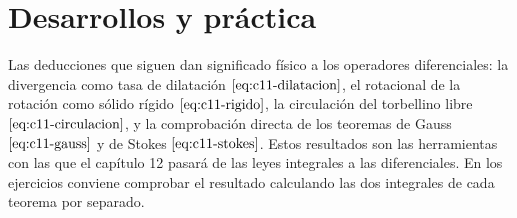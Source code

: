 \documentclass[10pt,openany]{book}
\begin{document}
\section{Desarrollos y práctica}

Las deducciones que siguen dan significado físico a los operadores diferenciales: la divergencia como tasa de dilatación \(\eqref{eq:c11-dilatacion}\), el rotacional de la rotación como sólido rígido \(\eqref{eq:c11-rigido}\), la circulación del torbellino libre \(\eqref{eq:c11-circulacion}\), y la comprobación directa de los teoremas de Gauss \(\eqref{eq:c11-gauss}\) y de Stokes \(\eqref{eq:c11-stokes}\). Estos resultados son las herramientas con las que el capítulo 12 pasará de las leyes integrales a las diferenciales. En los ejercicios conviene comprobar el resultado calculando las dos integrales de cada teorema por separado.
\end{document}
